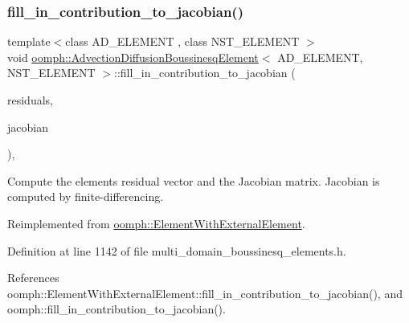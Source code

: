 \subsubsection{\texorpdfstring{fill\+\_\+in\+\_\+contribution\+\_\+to\+\_\+jacobian()}{fill\_in\_contribution\_to\_jacobian()}}
{\footnotesize\ttfamily template$<$class A\+D\+\_\+\+E\+L\+E\+M\+E\+NT , class N\+S\+T\+\_\+\+E\+L\+E\+M\+E\+NT $>$ \\
void \hyperlink{classoomph_1_1AdvectionDiffusionBoussinesqElement}{oomph\+::\+Advection\+Diffusion\+Boussinesq\+Element}$<$ A\+D\+\_\+\+E\+L\+E\+M\+E\+NT, N\+S\+T\+\_\+\+E\+L\+E\+M\+E\+NT $>$\+::fill\+\_\+in\+\_\+contribution\+\_\+to\+\_\+jacobian (\begin{DoxyParamCaption}\item[{\hyperlink{classoomph_1_1Vector}{Vector}$<$ double $>$ \&}]{residuals,  }\item[{\hyperlink{classoomph_1_1DenseMatrix}{Dense\+Matrix}$<$ double $>$ \&}]{jacobian }\end{DoxyParamCaption})\hspace{0.3cm}{\ttfamily [inline]}, {\ttfamily [virtual]}}



Compute the element\textquotesingle{}s residual vector and the Jacobian matrix. Jacobian is computed by finite-\/differencing. 



Reimplemented from \hyperlink{classoomph_1_1ElementWithExternalElement_ae5fb09552a8271e891438f8d058ca1b8}{oomph\+::\+Element\+With\+External\+Element}.



Definition at line 1142 of file multi\+\_\+domain\+\_\+boussinesq\+\_\+elements.\+h.



References oomph\+::\+Element\+With\+External\+Element\+::fill\+\_\+in\+\_\+contribution\+\_\+to\+\_\+jacobian(), and oomph\+::fill\+\_\+in\+\_\+contribution\+\_\+to\+\_\+jacobian().

\mbox{\label{classoomph_1_1AdvectionDiffusionBoussinesqElement_a375fb98e225dbd5ac716ed3f68831069}} 
